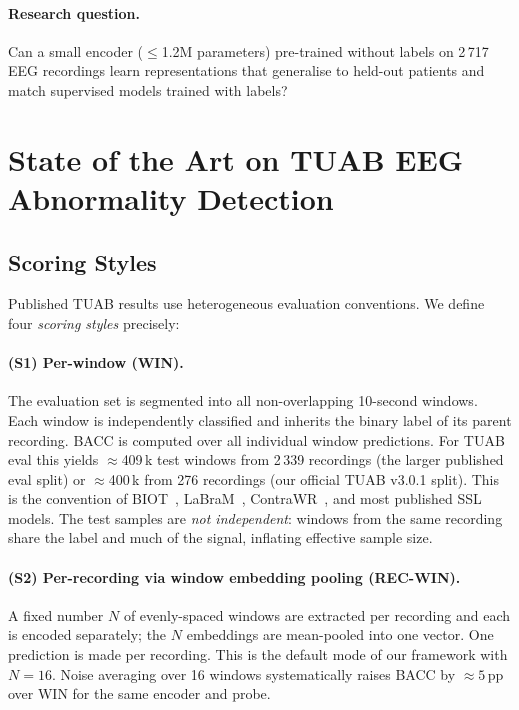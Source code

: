 \documentclass[11pt,a4paper]{article}
\begin{document}
\paragraph{Research question.}
Can a small encoder ($\leq$1.2M parameters) pre-trained without labels on 2\,717
EEG recordings learn representations that generalise to held-out patients and match
supervised models trained with labels?

\section{State of the Art on TUAB EEG Abnormality Detection}
\label{sec:sota}

\subsection{Scoring Styles}
\label{sec:scoring}

Published TUAB results use heterogeneous evaluation conventions.
We define four \emph{scoring styles} precisely:

\paragraph{(S1) Per-window (WIN).}
The evaluation set is segmented into all non-overlapping 10-second windows.
Each window is independently classified and inherits the binary label of its parent
recording.  BACC is computed over all individual window predictions.
For TUAB eval this yields ${\approx}$409\,k test windows from 2\,339 recordings
(the larger published eval split) or ${\approx}$400\,k from 276 recordings (our
official TUAB v3.0.1 split).
This is the convention of BIOT~\cite{biot}, LaBraM~\cite{labram}, ContraWR~\cite{contrawr},
and most published SSL models.
The test samples are \emph{not independent}: windows from the same recording share the
label and much of the signal, inflating effective sample size.

\paragraph{(S2) Per-recording via window embedding pooling (REC-WIN).}
A fixed number $N$ of evenly-spaced windows are extracted per recording and each is
encoded separately; the $N$ embeddings are mean-pooled into one vector.
One prediction is made per recording.
This is the default mode of our framework with $N{=}16$.
Noise averaging over 16 windows systematically raises BACC by ${\approx}5$\,pp over WIN
for the same encoder and probe.
\end{document}
